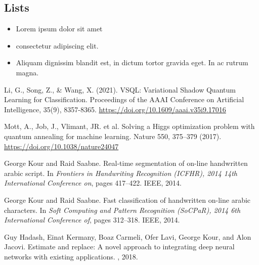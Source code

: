 \documentclass{article}
\begin{document}
\subsection{Lists}
\begin{itemize}
\item Lorem ipsum dolor sit amet
\item consectetur adipiscing elit. 
\item Aliquam dignissim blandit est, in dictum tortor gravida eget. In ac rutrum magna.
\end{itemize}


  


\begin{thebibliography}{1}


Li, G., Song, Z., \& Wang, X. (2021). 
VSQL: Variational Shadow Quantum Learning for Classification. 
Proceedings of the AAAI Conference on Artificial Intelligence, 35(9), 8357-8365. \url{https://doi.org/10.1609/aaai.v35i9.17016}

Mott, A., Job, J., Vlimant, JR. et al. Solving a Higgs optimization problem with 
quantum annealing for machine learning. Nature 550, 375–379 (2017). \url{https://doi.org/10.1038/nature24047}

George Kour and Raid Saabne.
\newblock Real-time segmentation of on-line handwritten arabic script.
\newblock In {\em Frontiers in Handwriting Recognition (ICFHR), 2014 14th
  International Conference on}, pages 417--422. IEEE, 2014.

George Kour and Raid Saabne.
\newblock Fast classification of handwritten on-line arabic characters.
\newblock In {\em Soft Computing and Pattern Recognition (SoCPaR), 2014 6th
  International Conference of}, pages 312--318. IEEE, 2014.

Guy Hadash, Einat Kermany, Boaz Carmeli, Ofer Lavi, George Kour, and Alon
  Jacovi.
\newblock Estimate and replace: A novel approach to integrating deep neural
  networks with existing applications.
, 2018.

\end{thebibliography}
\end{document}
